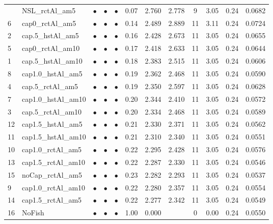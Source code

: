 \documentclass[11pt]{book}
\begin{document}
\begin{landscape}
\begin{longtable}[t]{llcccccccccc}
\midrule
\endhead
\
\endfoot
\bottomrule
\endlastfoot
17 & NSL\_rctAl\_am5 & $\bullet$ & $\bullet$ & $\bullet$ & 0.07 & 2.760 & 2.778 & 9 & 3.05 & 0.24 & 0.0682\\
6 & cap0\_rctAl\_am5 & $\bullet$ & $\bullet$ & $\bullet$ & 0.14 & 2.489 & 2.889 & 11 & 3.11 & 0.24 & 0.0724\\
2 & cap.5\_hstAl\_am5 & $\bullet$ & $\bullet$ & $\bullet$ & 0.16 & 2.428 & 2.673 & 11 & 3.05 & 0.24 & 0.0655\\
5 & cap0\_rctAl\_am10 & $\bullet$ & $\bullet$ & $\bullet$ & 0.17 & 2.418 & 2.633 & 11 & 3.05 & 0.24 & 0.0644\\
1 & cap.5\_hstAl\_am10 & $\bullet$ & $\bullet$ & $\bullet$ & 0.18 & 2.383 & 2.515 & 11 & 3.05 & 0.24 & 0.0606\\
8 & cap1.0\_hstAl\_am5 & $\bullet$ & $\bullet$ & $\bullet$ & 0.19 & 2.362 & 2.468 & 11 & 3.05 & 0.24 & 0.0590\\
4 & cap.5\_rctAl\_am5 & $\bullet$ & $\bullet$ & $\bullet$ & 0.19 & 2.350 & 2.597 & 11 & 3.05 & 0.24 & 0.0628\\
7 & cap1.0\_hstAl\_am10 & $\bullet$ & $\bullet$ & $\bullet$ & 0.20 & 2.344 & 2.410 & 11 & 3.05 & 0.24 & 0.0572\\
3 & cap.5\_rctAl\_am10 & $\bullet$ & $\bullet$ & $\bullet$ & 0.20 & 2.334 & 2.468 & 11 & 3.05 & 0.24 & 0.0589\\
12 & cap1.5\_hstAl\_am5 & $\bullet$ & $\bullet$ & $\bullet$ & 0.21 & 2.330 & 2.371 & 11 & 3.05 & 0.24 & 0.0562\\
11 & cap1.5\_hstAl\_am10 & $\bullet$ & $\bullet$ & $\bullet$ & 0.21 & 2.310 & 2.340 & 11 & 3.05 & 0.24 & 0.0551\\
10 & cap1.0\_rctAl\_am5 & $\bullet$ & $\bullet$ & $\bullet$ & 0.22 & 2.295 & 2.428 & 11 & 3.05 & 0.24 & 0.0576\\
13 & cap1.5\_rctAl\_am10 & $\bullet$ & $\bullet$ & $\bullet$ & 0.22 & 2.287 & 2.330 & 11 & 3.05 & 0.24 & 0.0546\\
15 & noCap\_rctAl\_am5 & $\bullet$ & $\bullet$ & $\bullet$ & 0.23 & 2.282 & 2.293 & 11 & 3.05 & 0.24 & 0.0537\\
9 & cap1.0\_rctAl\_am10 & $\bullet$ & $\bullet$ & $\bullet$ & 0.22 & 2.280 & 2.357 & 11 & 3.05 & 0.24 & 0.0554\\
14 & cap1.5\_rctAl\_am5 & $\bullet$ & $\bullet$ & $\bullet$ & 0.22 & 2.277 & 2.342 & 11 & 3.05 & 0.24 & 0.0549\\
16 & NoFish & $\bullet$ & $\bullet$ & $\bullet$ & 1.00 & 0.000 &  & 0 & 0.00 & 0.24 & 0.0550\\*
\end{longtable}
\end{landscape}
\endgroup{}
\end{document}
